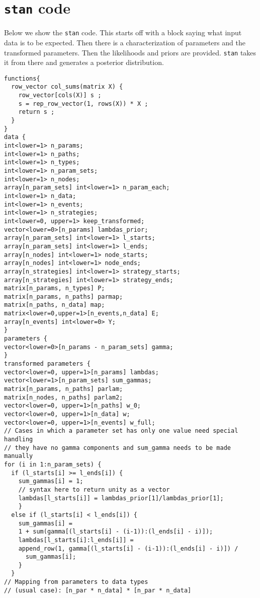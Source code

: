 \documentclass[
  12pt,
]{book}
\begin{document}
\hypertarget{stan-code}{%
\section{\texorpdfstring{\texttt{stan} code}{stan code}}\label{stan-code}}

Below we show the \texttt{stan} code. This starts off with a block saying what input data is to be expected. Then there is a characterization of parameters and the transformed parameters. Then the likelihoods and priors are provided. \texttt{stan} takes it from there and generates a posterior distribution.

\begin{verbatim}
functions{
  row_vector col_sums(matrix X) {
    row_vector[cols(X)] s ;
    s = rep_row_vector(1, rows(X)) * X ;
    return s ;
  }
}
data {
int<lower=1> n_params;
int<lower=1> n_paths;
int<lower=1> n_types;
int<lower=1> n_param_sets;
int<lower=1> n_nodes;
array[n_param_sets] int<lower=1> n_param_each;
int<lower=1> n_data;
int<lower=1> n_events;
int<lower=1> n_strategies;
int<lower=0, upper=1> keep_transformed;
vector<lower=0>[n_params] lambdas_prior;
array[n_param_sets] int<lower=1> l_starts;
array[n_param_sets] int<lower=1> l_ends;
array[n_nodes] int<lower=1> node_starts;
array[n_nodes] int<lower=1> node_ends;
array[n_strategies] int<lower=1> strategy_starts;
array[n_strategies] int<lower=1> strategy_ends;
matrix[n_params, n_types] P;
matrix[n_params, n_paths] parmap;
matrix[n_paths, n_data] map;
matrix<lower=0,upper=1>[n_events,n_data] E;
array[n_events] int<lower=0> Y;
}
parameters {
vector<lower=0>[n_params - n_param_sets] gamma;
}
transformed parameters {
vector<lower=0, upper=1>[n_params] lambdas;
vector<lower=1>[n_param_sets] sum_gammas;
matrix[n_params, n_paths] parlam;
matrix[n_nodes, n_paths] parlam2;
vector<lower=0, upper=1>[n_paths] w_0;
vector<lower=0, upper=1>[n_data] w;
vector<lower=0, upper=1>[n_events] w_full;
// Cases in which a parameter set has only one value need special handling
// they have no gamma components and sum_gamma needs to be made manually
for (i in 1:n_param_sets) {
  if (l_starts[i] >= l_ends[i]) {
    sum_gammas[i] = 1;
    // syntax here to return unity as a vector
    lambdas[l_starts[i]] = lambdas_prior[1]/lambdas_prior[1];
    }
  else if (l_starts[i] < l_ends[i]) {
    sum_gammas[i] =
    1 + sum(gamma[(l_starts[i] - (i-1)):(l_ends[i] - i)]);
    lambdas[l_starts[i]:l_ends[i]] =
    append_row(1, gamma[(l_starts[i] - (i-1)):(l_ends[i] - i)]) /
      sum_gammas[i];
    }
  }
// Mapping from parameters to data types
// (usual case): [n_par * n_data] * [n_par * n_data]

\end{verbatim}
\end{document}
